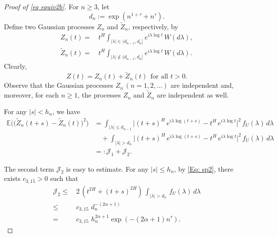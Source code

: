 \documentclass[11pt, reqno]{amsart}
\numberwithin{equation}{section}
\newcommand{\1}{{\bf 1}}
\newcommand{\2}{{\bf 2}}
\begin{document}
\begin{proof}[Proof of \eqref{eq equiv2b}]
For $n\ge 3$, let
$$
d_n:=\exp\left(n^{1+\tau}+n^{\tau} \right).
$$
Define two Gaussian processes $Z_n$ and $\widetilde{Z}_n$, respectively, by
\begin{align*}%
Z_n(t) =&\,  t^{H} \int_{|\lambda| \in (d_{n-1}, d_n]} e^{i \lambda\log  t}\, W(d\lambda),\\ %
  \widetilde{Z}_n(t) =&\,  t^{H} \int_{|\lambda| \notin (d_{n-1}, d_n]}  e^{i \lambda \log  t}\, W(d\lambda). %
\end{align*}
  Clearly, 
\begin{equation}\label{Eq:Xn3}
Z(t) = Z_n(t) + \widetilde{Z}_n(t) \ \ \text{for all  } t >0.  
\end{equation}
Observe that  the Gaussian processes $Z_n\, (n = 1, 2, \ldots)$ are
independent and, moreover, for each $n \ge 1$, the processes $Z_n$ and $\widetilde{Z}_n$ are independent as well.

For any $|s|<h_n$, we have 
\begin{equation}\label{Eq:J1}
\begin{split}
\mathbb E\Big(\big(\widetilde{Z}_n(t+s) - \widetilde{Z}_n(t)\big)^2\Big) &=
\int_{|\lambda|\le d_{n-1}} \big| (t+s)^{H} \, e^{i \lambda \log  (t+s)} -
t^{H} \, e^{i \lambda \log  t}\big|^2 \,f_U(\lambda)\, d\lambda\\
&\quad + \int_{|\lambda| > d_{n}} \big| (t+s)^{H} \, e^{i \lambda
\log  (t+s)} - t^{H} \, e^{i \lambda \log  t}\big|^2 \,f_U(\lambda)\,
d\lambda\\
&=: \mathcal J_1 + \mathcal J_2.
\end{split}
\end{equation}

The second term $\mathcal J_2$ is easy to estimate.  For any $|s|\le  {h_n}$,  by   \eqref{Eq: sp2}, there exists $c_{3,15}>0$ such  that
\begin{equation}\label{Eq:J2}
\begin{split}
\mathcal {J}_2 \le&\, 2\,\left(t^{2H}+ (t+s)^{2H}\right)\, \int _{|\lambda| >
d_{n}}\,f_U(\lambda)\, d\lambda\\
\le&\, c_{3,15}\,   \,
d_n^{-(2\alpha+1)}\\
=&\, c_{3,15}\,   \,
h_n^{2\alpha+1} \exp\left(-(2\alpha+1)n^{\tau}\right).
\end{split}
\end{equation} 


\end{proof}
\end{document}
